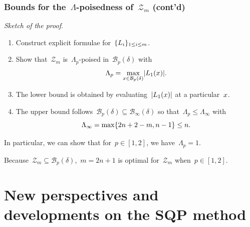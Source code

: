 \documentclass{polyu-presentation}
\newcommand{\iter}[1][]{x\ifthenelse{\equal{#1}{}}{}{^{#1}}}
\newcommand{\lagp}[1][]{L\ifthenelse{\equal{#1}{}}{}{_{#1}}}
\begin{document}
\begin{frame}
    \frametitle{Bounds for the~$\Lambda$-poisedness of~$\mathcal{Z}_m$ (cont'd)}

    \emph{Sketch of the proof}.
    \begin{enumerate}
        \item Construct explicit formulae for~$\set{\lagp[i]}_{1 \le i \le m}$.
        \item Show that~$\mathcal{Z}_m$ is~$\Lambda_p$-poised in~$\mathcal{B}_p(\delta)$ with
        \begin{equation*}
            \Lambda_p = \max_{\iter \in \mathcal{B}_p(\delta)} \abs{\lagp[1](\iter)}.
        \end{equation*}
        \item The lower bound is obtained by evaluating~$\abs{\lagp[1](\iter)}$ at a particular~$\iter$.
        \item The upper bound follows~$\mathcal{B}_p(\delta) \subseteq \mathcal{B}_{\infty}(\delta)$ so that~$\Lambda_p \le \Lambda_{\infty}$ with
        \begin{equation*}
            \Lambda_{\infty} = \max \{2n + 2 - m, n - 1\} \le n.
        \end{equation*}
    \end{enumerate}

    \smallskip

    In particular, we can show that for~$p \in [1, 2]$, we have~$\Lambda_p = 1$.

    \begin{block}{}
        Because~$\mathcal{Z}_m \subseteq \mathcal{B}_p(\delta)$,~$m = 2n + 1$ is \alert{optimal} for~$\mathcal{Z}_m$ when~$p \in [1, 2]$.
    \end{block}
\end{frame}

\section{New perspectives and developments on the SQP method}
\end{document}
